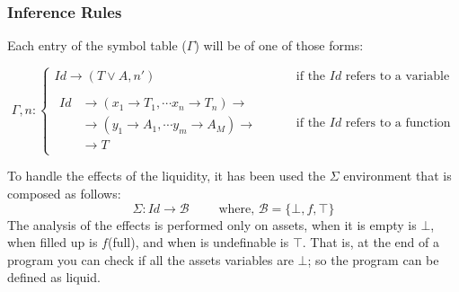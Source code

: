 \documentclass[11pt]{article} %
\begin{document}
\subsubsection{Inference Rules}
Each entry of the symbol table ($ \Gamma $) will be of one of those forms:

\begin{equation}
\Gamma, n :
	\begin{cases}
	Id \rightarrow ( T \lor A, n' ) \qquad & \text{if the } Id \text{ refers to a variable} \\ \\
	\begin{split}
	Id & \rightarrow  (x_1 \rightarrow T_1,\cdots
          							 x_n \rightarrow T_n) \rightarrow \\
          		   &		\rightarrow (y_1 \rightarrow A_1,\cdots
          							 y_m \rightarrow A_M) \rightarrow \\
          		   &		\rightarrow T 
	\end{split} \qquad & \text{if the } Id \text{ refers to a function}
	\end{cases}
\end{equation}

To handle the effects of the liquidity, it has been used the $\Sigma$ environment that is composed as follows: \\ 
\[
\Sigma : Id \rightarrow \mathcal{B} \qquad
\text{ where, } \mathcal{B} =\{ \bot, f , \top \}
\]
The analysis of the effects is performed only on assets, when it is empty is $\bot$, when filled up is $f$(full), and when is undefinable is $\top$. That is, at the end of a program you can check if all the assets variables are $\bot$; so the program can be defined as liquid.

\medskip
\end{document}
